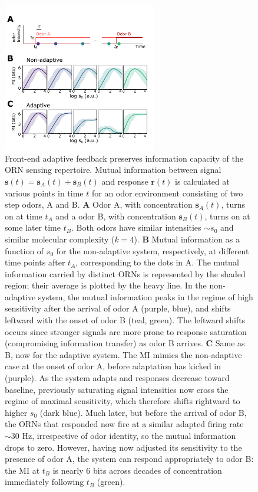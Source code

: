 \documentclass[9pt,twoside,lineno]{pnas-new}
\begin{document}
\begin{figure}
\centering
\includegraphics[width=0.6\textwidth]{figures/2_coding_representation_SI}
\caption{Front-end adaptive feedback preserves information capacity of the ORN sensing repertoire. Mutual information between signal $\mathbf s(t)=\mathbf s_A(t)+\mathbf s_B(t)$ and response $\mathbf r(t)$ is calculated at various points in time $t$ for an odor environment consisting of two step odors, A and B. 
\textbf{A} Odor A, with concentration $\mathbf s_A(t)$, turns on at time $t_A$ and a odor B, with concentration $\mathbf s_B(t)$, turns on at some later time $t_B$. Both odors have similar intensities $\sim s_0$ and similar molecular complexity ($k = 4$). 
\textbf{B} Mutual information as a function of $s_0$ for the non-adaptive system, respectively, at different time points after $t_A$, corresponding to the dots in A. The mutual information carried by distinct ORNs is represented by the shaded region; their average is plotted by the heavy line. In the non-adaptive system, the mutual information peaks in the regime of high sensitivity after the arrival of odor A (purple, blue), and shifts leftward with the onset of odor B (teal, green). The leftward shifts occurs since stronger signals are more prone to response saturation (compromising information transfer) as odor B arrives. 
\textbf{C} Same as B, now for the adaptive system. The MI mimics the non-adaptive case at the onset of odor A, before adaptation has kicked in (purple). As the system adapts and responses decrease toward baseline, previously saturating signal intensities now cross the regime of maximal sensitivity, which therefore shifts rightward to higher $s_0$ (dark blue). Much later, but before the arrival of odor B, the ORNs that responded now fire at a similar  adapted firing rate $\sim 30$ Hz, irrespective of odor identity, so the mutual information drops to zero. However, having now adjusted its sensitivity to the presence of odor A, the system can respond appropriately to odor B: the MI at $t_B$ is nearly 6 bits across decades of concentration immediately following $t_B$ (green). 
}
\label{fig:SI_MI}
\end{figure}
\end{document}
